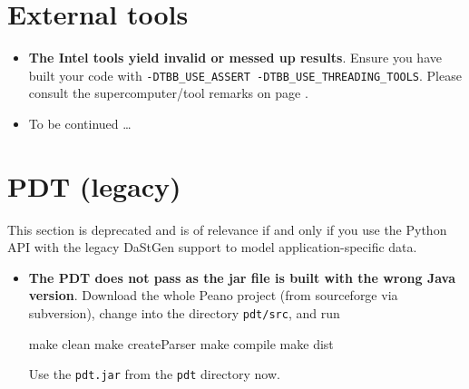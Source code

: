 \section{External tools}
\begin{itemize}
  \item \textbf{The Intel tools yield invalid or messed up results}. Ensure 
    you have built your code with \texttt{-DTBB\_USE\_ASSERT
    -DTBB\_USE\_THREADING\_TOOLS}. Please consult the supercomputer/tool remarks
    on page \pageref{section:supercomputers:IntelTools}.
  \item To be continued \dots
\end{itemize}



\section{PDT (legacy)}

This section is deprecated and is of relevance if and only if you use the Python API with 
the legacy DaStGen support to model application-specific data.


\begin{itemize}
  \item \textbf{ The PDT does not pass as the jar file is built with the wrong
  Java version}. Download the whole Peano project (from sourceforge via subversion),
  change into the directory \texttt{pdt/src}, and run
  \begin{code}
  make clean
  make createParser
  make compile
  make dist
  \end{code}
  Use the \texttt{pdt.jar} from the \texttt{pdt} directory now. 
\end{itemize}






